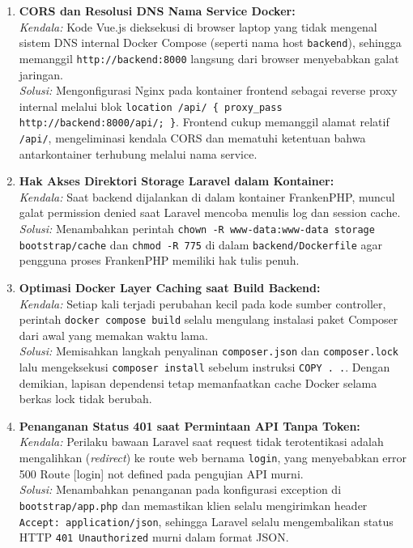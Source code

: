 \documentclass[11pt,a4paper]{article}
\begin{document}
\begin{enumerate}
    \item \textbf{CORS dan Resolusi DNS Nama Service Docker:}\\
    \textit{Kendala:} Kode Vue.js dieksekusi di browser laptop yang tidak mengenal sistem DNS internal Docker Compose (seperti nama host \texttt{backend}), sehingga memanggil \texttt{http://backend:8000} langsung dari browser menyebabkan galat jaringan.\\
    \textit{Solusi:} Mengonfigurasi Nginx pada kontainer frontend sebagai reverse proxy internal melalui blok \texttt{location /api/ \{ proxy\_pass http://backend:8000/api/; \}}. Frontend cukup memanggil alamat relatif \texttt{/api/}, mengeliminasi kendala CORS dan mematuhi ketentuan bahwa antarkontainer terhubung melalui nama service.

    \item \textbf{Hak Akses Direktori Storage Laravel dalam Kontainer:}\\
    \textit{Kendala:} Saat backend dijalankan di dalam kontainer FrankenPHP, muncul galat permission denied saat Laravel mencoba menulis log dan session cache.\\
    \textit{Solusi:} Menambahkan perintah \texttt{chown -R www-data:www-data storage bootstrap/cache} dan \texttt{chmod -R 775} di dalam \texttt{backend/Dockerfile} agar pengguna proses FrankenPHP memiliki hak tulis penuh.

    \item \textbf{Optimasi Docker Layer Caching saat Build Backend:}\\
    \textit{Kendala:} Setiap kali terjadi perubahan kecil pada kode sumber controller, perintah \texttt{docker compose build} selalu mengulang instalasi paket Composer dari awal yang memakan waktu lama.\\
    \textit{Solusi:} Memisahkan langkah penyalinan \texttt{composer.json} dan \texttt{composer.lock} lalu mengeksekusi \texttt{composer install} sebelum instruksi \texttt{COPY . .}. Dengan demikian, lapisan dependensi tetap memanfaatkan cache Docker selama berkas lock tidak berubah.

    \item \textbf{Penanganan Status 401 saat Permintaan API Tanpa Token:}\\
    \textit{Kendala:} Perilaku bawaan Laravel saat request tidak terotentikasi adalah mengalihkan (\textit{redirect}) ke route web bernama \texttt{login}, yang menyebabkan error 500 Route [login] not defined pada pengujian API murni.\\
    \textit{Solusi:} Menambahkan penanganan pada konfigurasi exception di \texttt{bootstrap/app.php} dan memastikan klien selalu mengirimkan header \texttt{Accept: application/json}, sehingga Laravel selalu mengembalikan status HTTP \texttt{401 Unauthorized} murni dalam format JSON.


\end{enumerate}
\end{document}
